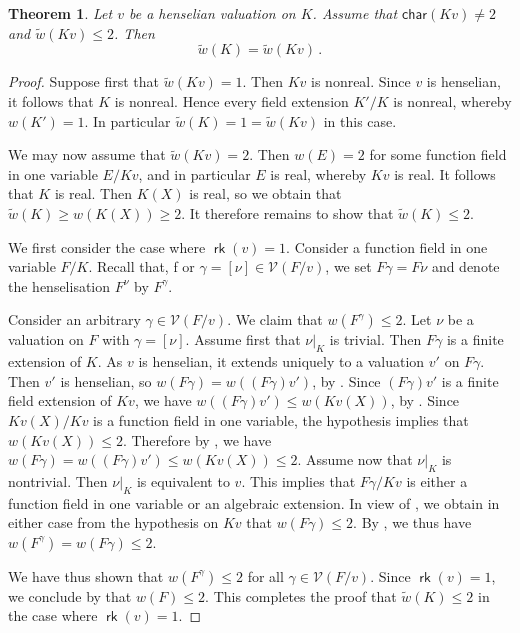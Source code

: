 \documentclass[twoside,11pt]{amsart}
\numberwithin{equation}{section}
\newtheorem{thm}[equation]{Theorem}
\theoremstyle{definition}
\newcommand{\car}{\mathsf{char}}
\renewcommand{\leq}{\leqslant}
\renewcommand{\geq}{\geqslant}
\newcommand\rk{\operatorname{\mathsf{rk}}}
\newcommand{\mc}{\mathcal}
\renewcommand{\leq}{\leqslant}
\renewcommand{\geq}{\geqslant}
\newcommand{\wt}{\widetilde}
\begin{document}
\begin{thm}\label{value}
    Let $v$ be a henselian valuation on $K$.
    Assume that  $\car(Kv)\neq 2$ and $\wt{w}(Kv)\leq 2$.
    Then $$\wt{w}(K)=\wt{w}(Kv)\,.$$
    
\end{thm}
\begin{proof}
Suppose first that $\wt{w}(Kv)=1$. Then $Kv$ is nonreal.
Since $v$ is henselian, it follows that $K$ is nonreal.
Hence every field extension $K'/K$ is nonreal, whereby $w(K')=1$.
In particular $\wt{w}(K)=1=\wt{w}(Kv)$ in this case.

We may now assume that $\wt{w}(Kv)=2$.
Then $w(E)=2$ for some function field in one variable $E/Kv$, and in particular $E$ is real, whereby $Kv$ is real.
It follows that $K$ is real.
Then $K(X)$ is real, so we obtain that $\wt{w}(K)\geq w(K(X))\geq 2$.
It therefore remains to show that $\wt{w}(K)\leq 2$.

We first consider the case where $\rk(v)=1$.
Consider a function field in one variable $F/K$.
Recall that, f or $\gamma=[\nu]\in\mc{V}(F/v)$, we set $F\gamma=F\nu$ and denote the henselisation
$F^\nu$ by $F^\gamma$.

Consider an arbitrary $\gamma\in\mc{V}(F/v)$. We claim that $w(F^\gamma)\leq 2$.
Let $\nu$ be a valuation on $F$ with $\gamma=[\nu]$.
Assume first that $\nu|_K$ is trivial. Then $F\gamma$ is a finite extension of $K$.
As $v$ is henselian, it extends uniquely to a valuation $v'$ on $F\gamma$.
Then $v'$ is henselian, so $w(F\gamma)=w((F\gamma)v')$, by .
Since $(F\gamma)v'$ is a finite field extension of $Kv$, we have $w((F\gamma)v')\leq w(Kv(X))$, by .
Since $Kv(X)/Kv$ is a function field in one variable,
the hypothesis implies that $w(Kv(X))\leq 2$.
Therefore  by , we have $w(F\gamma)=w((F\gamma)v')\leq w(Kv(X))\leq 2$.
Assume now that $\nu|_K$ is nontrivial. Then $\nu|_K$ is equivalent to $v$.
This implies that $F\gamma/Kv$ is either a function field in one variable or an algebraic extension. 
In view of , we obtain in either case from the hypothesis on $Kv$ that $w(F\gamma)\leq 2$.
By , we thus have $w(F^\gamma)=w(F\gamma)\leq 2$.

We have thus shown that $w(F^\gamma)\leq 2$
for all $\gamma\in\mc{V}(F/v)$. Since $\rk(v)=1$, we conclude by  that $w(F)\leq 2$.
This completes the proof that $\wt{w}(K)\leq 2$ in the case where $\rk(v)=1$.


\end{proof}
\end{document}
